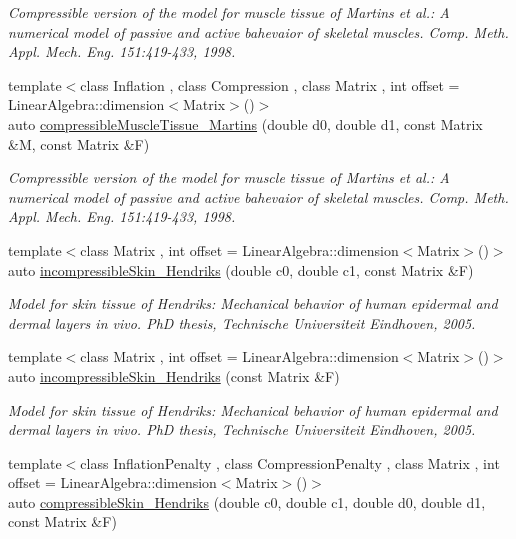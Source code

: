 \begin{DoxyCompactItemize}
\begin{DoxyCompactList}\small\item\em Compressible version of the model for muscle tissue of Martins et al.\-: A numerical model of passive and active bahevaior of skeletal muscles. Comp. Meth. Appl. Mech. Eng. 151\-:419-\/433, 1998. \end{DoxyCompactList}\item 
{\footnotesize template$<$class Inflation , class Compression , class Matrix , int offset = Linear\-Algebra\-::dimension$<$\-Matrix$>$()$>$ }\\auto \hyperlink{group__Biomechanics_ga3bd109a716f5eab7c263fa42cb66a937}{compressible\-Muscle\-Tissue\-\_\-\-Martins} (double d0, double d1, const Matrix \&M, const Matrix \&F)
\begin{DoxyCompactList}\small\item\em Compressible version of the model for muscle tissue of Martins et al.\-: A numerical model of passive and active bahevaior of skeletal muscles. Comp. Meth. Appl. Mech. Eng. 151\-:419-\/433, 1998. \end{DoxyCompactList}\item 
{\footnotesize template$<$class Matrix , int offset = Linear\-Algebra\-::dimension$<$\-Matrix$>$()$>$ }\\auto \hyperlink{group__Biomechanics_ga2c1299d3275e15fee450d33b69f3c537}{incompressible\-Skin\-\_\-\-Hendriks} (double c0, double c1, const Matrix \&F)
\begin{DoxyCompactList}\small\item\em Model for skin tissue of Hendriks\-: Mechanical behavior of human epidermal and dermal layers in vivo. Ph\-D thesis, Technische Universiteit Eindhoven, 2005. \end{DoxyCompactList}\item 
{\footnotesize template$<$class Matrix , int offset = Linear\-Algebra\-::dimension$<$\-Matrix$>$()$>$ }\\auto \hyperlink{group__Biomechanics_gae120c2a20a841a63c19cee23f7eba317}{incompressible\-Skin\-\_\-\-Hendriks} (const Matrix \&F)
\begin{DoxyCompactList}\small\item\em Model for skin tissue of Hendriks\-: Mechanical behavior of human epidermal and dermal layers in vivo. Ph\-D thesis, Technische Universiteit Eindhoven, 2005. \end{DoxyCompactList}\item 
{\footnotesize template$<$class Inflation\-Penalty , class Compression\-Penalty , class Matrix , int offset = Linear\-Algebra\-::dimension$<$\-Matrix$>$()$>$ }\\auto \hyperlink{group__Biomechanics_ga749204473b9790e8479bbbbe0b703694}{compressible\-Skin\-\_\-\-Hendriks} (double c0, double c1, double d0, double d1, const Matrix \&F)

\end{DoxyCompactItemize}
